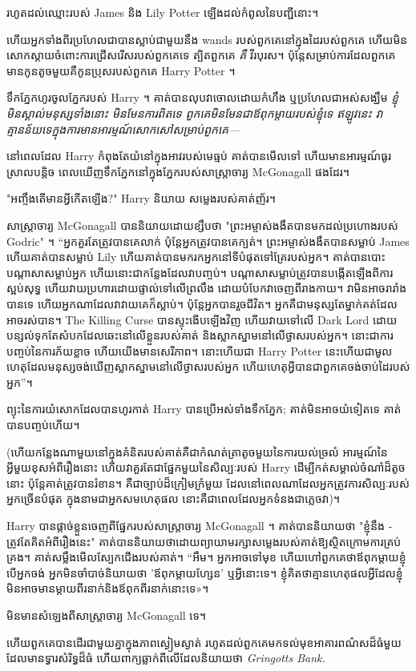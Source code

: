 រហូតដល់ឈ្មោះរបស់ James និង Lily Potter ឡើងដល់កំពូលនៃបញ្ជីនោះ។

ហើយអ្នកទាំងពីរប្រហែលជាបានស្លាប់ជាមួយនឹង wands របស់ពួកគេនៅក្នុងដៃរបស់ពួកគេ ហើយមិនសោកស្តាយចំពោះការជ្រើសរើសរបស់ពួកគេទេ ត្បិតពួកគេ \emph{គឺ} វីរបុរស។ ប៉ុន្តែ​សម្រាប់​ការ​ដែល​ពួក​គេ​មាន​កូន​តូច​មួយ​គឺ​កូន​ប្រុស​របស់​ពួក​គេ Harry Potter ។

ទឹកភ្នែកហូរចូលភ្នែករបស់ Harry ។ គាត់បានលុបវាចោលដោយកំហឹង ឬប្រហែលជាអស់សង្ឃឹម \emph{ខ្ញុំមិនស្គាល់មនុស្សទាំងនោះ មិនមែនការពិតទេ ពួកគេមិនមែនជាឪពុកម្តាយរបស់ខ្ញុំទេ \emph{ឥឡូវនេះ} វាគ្មានន័យទេក្នុងការមានអារម្មណ៍សោកសៅសម្រាប់ពួកគេ—}

នៅពេលដែល Harry កំពុងតែយំនៅក្នុងអាវរបស់មេធ្មប់ គាត់បានមើលទៅ ហើយមានអារម្មណ៍ធូរស្រាលបន្តិច ពេលឃើញទឹកភ្នែកនៅក្នុងភ្នែករបស់សាស្រ្តាចារ្យ McGonagall ផងដែរ។

"អញ្ចឹងតើមានអ្វីកើតឡើង?" Harry និយាយ សម្លេងរបស់គាត់ញ័រ។

សាស្ត្រាចារ្យ McGonagall បាននិយាយដោយខ្សឹបថា "ព្រះអម្ចាស់ងងឹតបានមកដល់ប្រហោងរបស់ Godric" ។ “អ្នក​គួរ​តែ​ត្រូវ​បាន​គេ​លាក់ ប៉ុន្តែ​អ្នក​ត្រូវ​បាន​គេ​ក្បត់។ ព្រះអម្ចាស់ងងឹតបានសម្លាប់ James ហើយគាត់បានសម្លាប់ Lily ហើយគាត់បានមករកអ្នកនៅទីបំផុតទៅគ្រែរបស់អ្នក។ គាត់បានបោះបណ្តាសាសម្លាប់អ្នក ហើយនោះជាកន្លែងដែលវាបញ្ចប់។ បណ្តាសាសម្លាប់ត្រូវបានបង្កើតឡើងពីការស្អប់សុទ្ធ ហើយវាយប្រហារដោយផ្ទាល់ទៅលើព្រលឹង ដោយបំបែកវាចេញពីរាងកាយ។ វា​មិន​អាច​រារាំង​បាន​ទេ ហើយ​អ្នក​ណា​ដែល​វា​វាយ​គេ​ក៏​ស្លាប់។ ប៉ុន្តែអ្នកបានរួចជីវិត។ អ្នកគឺជាមនុស្សតែម្នាក់គត់ដែលអាចរស់បាន។ The Killing Curse បានស្ទុះងើបឡើងវិញ ហើយវាយទៅលើ Dark Lord ដោយបន្សល់ទុកតែសំបកដែលឆេះនៅលើខ្លួនរបស់គាត់ និងស្លាកស្នាមនៅលើថ្ងាសរបស់អ្នក។ នោះ​ជា​ការ​បញ្ចប់​នៃ​ការ​ភ័យ​ខ្លាច ហើយ​យើង​មាន​សេរីភាព។ នោះហើយជា Harry Potter នេះហើយជាមូលហេតុដែលមនុស្សចង់ឃើញស្លាកស្នាមនៅលើថ្ងាសរបស់អ្នក ហើយហេតុអ្វីបានជាពួកគេចង់ចាប់ដៃរបស់អ្នក”។

ព្យុះ​នៃ​ការ​យំ​សោក​ដែល​បាន​ហូរ​កាត់​ Harry បាន​ប្រើ​អស់​ទាំង​ទឹកភ្នែក; គាត់មិនអាចយំទៀតទេ គាត់បានបញ្ចប់ហើយ។

(ហើយកន្លែងណាមួយនៅក្នុងគំនិតរបស់គាត់គឺជាកំណត់ត្រាតូចមួយនៃការយល់ច្រលំ អារម្មណ៍នៃអ្វីមួយខុសអំពីរឿងនោះ ហើយវាគួរតែជាផ្នែកមួយនៃសិល្បៈរបស់ Harry ដើម្បីកត់សម្គាល់ចំណាំដ៏តូចនោះ ប៉ុន្តែគាត់ត្រូវបានរំខាន។ គឺជាច្បាប់ដ៏ក្រៀមក្រំមួយ ដែលនៅពេលណាដែលអ្នកត្រូវការសិល្បៈរបស់អ្នកច្រើនបំផុត ក្នុងនាមជាអ្នកសមហេតុផល នោះគឺជាពេលដែលអ្នកទំនងជាភ្លេចវា)។

Harry បានផ្តាច់ខ្លួនចេញពីផ្នែករបស់សាស្រ្តាចារ្យ McGonagall ។ គាត់បាននិយាយថា "ខ្ញុំនឹង - ត្រូវតែគិតអំពីរឿងនេះ" គាត់បាននិយាយថាដោយព្យាយាមរក្សាសម្លេងរបស់គាត់ឱ្យស្ថិតក្រោមការគ្រប់គ្រង។ គាត់សម្លឹងមើលស្បែកជើងរបស់គាត់។ “អឹម។ អ្នក​អាច​ទៅ​មុខ ហើយ​ហៅ​ពួកគេ​ថា​ឪពុកម្ដាយ​ខ្ញុំ បើ​អ្នក​ចង់ អ្នក​មិន​ចាំបាច់​និយាយ​ថា 'ឪពុកម្តាយ​ហ្សែន' ឬ​អ្វី​នោះ​ទេ។ ខ្ញុំ​គិត​ថា​គ្មាន​ហេតុផល​អ្វី​ដែល​ខ្ញុំ​មិន​អាច​មាន​ម្តាយ​ពីរ​នាក់​និង​ឪពុក​ពីរ​នាក់​នោះ​ទេ»។

មិនមានសំឡេងពីសាស្រ្តាចារ្យ McGonagall ទេ។

ហើយពួកគេបានដើរជាមួយគ្នាក្នុងភាពស្ងៀមស្ងាត់ រហូតដល់ពួកគេមកទល់មុខអាគារពណ៌សដ៏ធំមួយដែលមានទ្វារសំរិទ្ធដ៏ធំ ហើយពាក្យឆ្លាក់ពីលើដែលនិយាយថា \emph{Gringotts Bank.}

